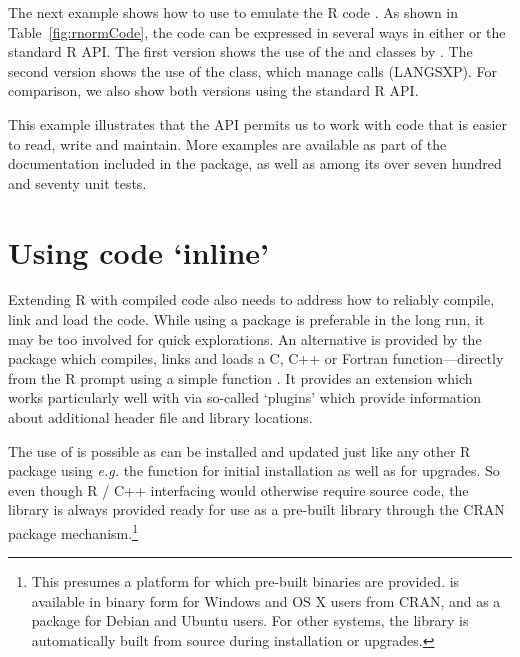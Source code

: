 The next example shows how to use  to emulate the R code
.
%
As shown in Table~\ref{fig:rnormCode}, the code can be expressed in several
ways in either  or the standard R API. The first version shows the
use of the  and  classes by
.
The second version shows the use of the  class, which 
manage calls (LANGSXP). 
For comparison, we also show both versions using the standard R API.

This example illustrates that the  API permits us to work with code
that is easier to read, write and maintain. More examples are available as
part of the documentation included in the  package, as well as
among its over seven hundred and seventy unit tests.

\section{Using code `inline'}
\label{sec:inline}

Extending R with compiled code also needs to address how to reliably compile,
link and load the code.  While using a package is preferable in the long run,
it may be too involved for quick explorations. An alternative is
provided by the  package \citep{cran:inline} which compiles,
links and loads a C, C++ or Fortran function---directly from the R prompt
using a simple function .  It provides an extension which
works particularly well with  via so-called `plugins' which provide
information about additional header file and
library locations. 

The use of  is possible as  can be installed and
updated just like any other R package using \textsl{e.g.} the
 function for initial installation as well as
 for upgrades.  So even though R / C++ interfacing
would otherwise require source code, the  library is always provided
ready for use as a pre-built library through the CRAN package
mechanism.\footnote{This presumes a platform for which pre-built binaries are
  provided.  is available in binary form for Windows and OS X users from
  CRAN, and as a  package for Debian and Ubuntu users. For other systems, the
   library is automatically built from source during installation
  or upgrades.}

